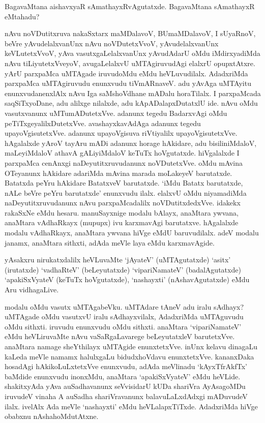BagavaMtana aishavxyaR sAmathayxRvAgutatxde. BagavaMtana sAmathayxR eMtahadu?

nAvu noVDutitxruva nakaSxtarx maMDalavoV, BUmaMDalavoV, I sUyaRnoV, beVre yAvudelalxvanUnx nAvu noVDutetxVvoV, yAvudelalxvanUnx keVLutetxVvoV, yAva vasutxgaLelalxvanUnx yAvudAdarU oMdu iMdirxyadiMda nAvu tiLiyutetxVveyoV, avugaLelalxvU uMTAgiruvudAgi elalxrU opupxtAtxre. yArU parxpaMca uMTAgade iruvudoMdu eMdu heVLuvudilalx. AdadxriMda parxpaMca uMTAgiruvudu enunxvudu tiVmARnaveV. adu yAvAga uMTAyitu enunxvudanenxlAlx nAvu Iga saMshoVdhane mADalu horaTilalx. I parxpaMcada saqSiTxyoDane, adu alilxge nilalxde, adu kApADalapxDutatxlU ide. nAvu oMdu vasutxvanunx uMTumADutetxVve. adanunx tegedu BadarxvAgi oMdu peTiTxgeyalilxDutetxVve. avashayxkavAdAga adanunx tegedu upayoVgisutetxVve. adanunx upayoVgisuva riVtiyalilx upayoVgisutetxVve. hAgalalxde yAroV tayAru mADi adanunx horage hAkidare, adu bisiliniMdaloV, maLeyiMdaloV athavA gALiyiMdaloV keTuTx hoVgutatxde. hiVgalalxde I parxpaMca cenAnxgi naDeyutitxruvudanunx noVDutetxVve. oMdu mAvina OTeyanunx hAkidare adariMda mAvina marada moLakeyeV barutatxde. Batatxda peYru hAkidare BatatxveV barutatxde. `iMdu Batatx barutatxde, nALe beVre peYru barutatxde' enunxvudu ilalx. elalxvU oMdu niyamadiMda naDeyutitxruvudanunx nAvu parxpaMcadalilx noVDutitxdedxVve. idakekx rakaSxNe eMdu hesaru. manuSayxnige modalu bAlayx, anaMtara ywvana, anaMtara vAdhaRkayx (mupupx) ivu karxmavAgi barutatxve. hAgalalxde modalu vAdhaRkayx, anaMtara ywvana hiVge eMdU baruvudilalx. adeV modalu janamx, anaMtara sithxti, adAda meVle laya eMdu karxmavAgide.

yAsakxru nirukatxdalilx heVLuvaMte `jAyateV' (uMTAgutatxde) `asitx' (irutatxde) `vadhaRteV' (beLeyutatxde) `vipariNamateV' (badalAgutatxde) `apakiSxVyateV (keTuTx hoVgutatxde), `nashayxti' (nAshavAgutatxde) eMdu Aru vidhagaLive.

modalu oMdu vasutx uMTAgabeVku. uMTAdare tAneV adu iralu sAdhayx? uMTAgade oMdu vasutxvU iralu sAdhayxvilalx, AdadxriMda uMTAguvudu oMdu sithxti. iruvudu enunxvudu oMdu sithxti. anaMtara `vipariNamateV' eMdu heVLiruvaMte nAvu {} vaSaRgaLavarege beLeyutatxleV barutetxVve. anaMtara namage sheYthilayx uMTAgide enunxtetxVve. inUnx kelavu dinagaLu kaLeda meVle namamx halulxgaLu bidudxhoVdavu enunxtetxVve. kananxDaka hosadAgi hAkikoLuLxtetxVve enunxvudu, adAda meVlinadu `kAyxTfrAkfTx' baMdide enunxvudu inonxMdu, anaMtara `apakiSxVyateV' eMdu heVLide. shakitxyAda yAva auSadhavanunx seVvisidarU kUDa shariVra AyAsagoMDu iruvudeV vinaha A auSadha shariVravanunx balavuLaLxdAdxgi mADuvudeV ilalx. ivelAlx Ada meVle `nashayxti' eMdu heVLalapxTiTxde. AdadxriMda hiVge obabxnu nAshahoMdutAtxne.


